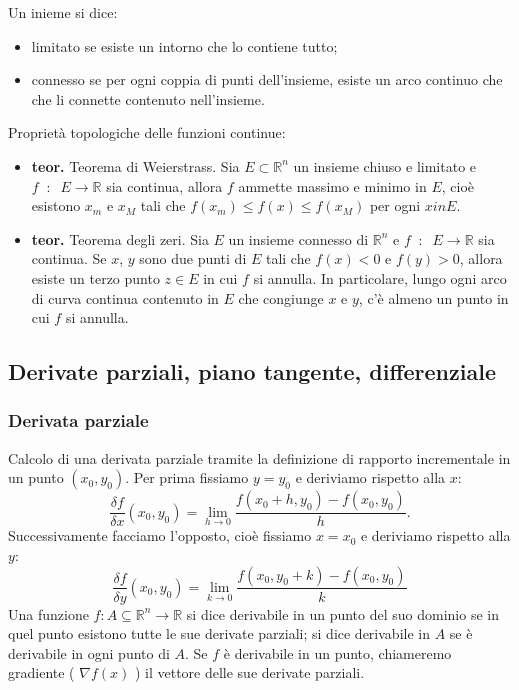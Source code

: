 Un inieme si dice:
\begin{itemize}
    \item limitato se esiste un intorno che lo contiene tutto;
    \item connesso se per ogni coppia di punti dell'insieme, esiste un arco continuo che che li connette contenuto nell'insieme.
\end{itemize}
Proprietà topologiche delle funzioni continue:
\begin{itemize}
    \item \textbf{teor.} Teorema di Weierstrass. Sia $E \subset \mathbb{R}^n$ un insieme chiuso e limitato e $f \;\;:\;\; E \rightarrow \mathbb{R}$ sia continua, allora $f$ ammette massimo e minimo in $E$, cioè esistono $x_m$ e $x_M$ tali che $f(x_m) \leq f(x) \leq f(x_M)$ per ogni $x in E$.
    \item \textbf{teor.} Teorema degli zeri. Sia $E$ un insieme connesso di $\mathbb{R}^n$ e $f \;\;:\;\; E \rightarrow \mathbb{R}$ sia continua. Se $x$, $y$ sono due punti di $E$ tali che $ f(x) < 0$ e $f(y) > 0$, allora esiste un terzo punto $z \in E$ in cui $f$ si annulla. In particolare, lungo ogni arco di curva continua contenuto in $E$ che congiunge $x$ e $y$, c'è almeno un punto in cui $f$ si annulla.
\end{itemize}
\subsection*{Derivate parziali, piano tangente, differenziale}
\subsubsection*{Derivata parziale}
Calcolo di una derivata parziale tramite la definizione di rapporto incrementale in un punto $(x_0, y_0)$. \newline
Per prima fissiamo $y=y_0$ e deriviamo rispetto alla $x$:
\[
    \frac{\delta f}{\delta x} (x_0,y_0) = \lim_{h\rightarrow 0}\frac{f(x_0+h, y_0)- f(x_0,y_0)}{h}.
\]
Successivamente facciamo l'opposto, cioè fissiamo $x=x_0$ e deriviamo rispetto alla $y$:
\[
    \frac{\delta f}{\delta y} (x_0,y_0) = \lim_{k\rightarrow 0}\frac{f(x_0, y_0+k)- f(x_0,y_0)}{k}
\]
Una funzione $f: A \subseteq \mathbb{R}^n \rightarrow  \mathbb{R}$ si dice derivabile in un punto del suo dominio se in quel punto esistono tutte le sue derivate parziali; si dice derivabile in $A$ se è derivabile in ogni punto di $A$.\newline
Se $f$ è derivabile in un punto, chiameremo gradiente ( $\nabla f(x)$ ) il vettore delle sue derivate parziali.
